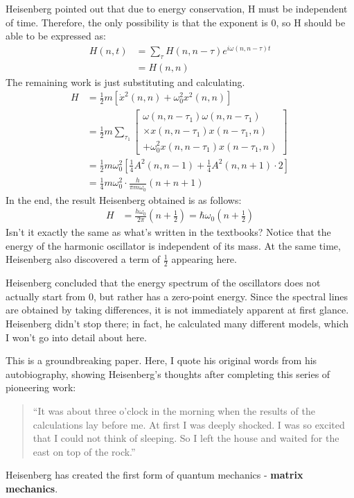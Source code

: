 \documentclass[a4paper, 12pt, oneside, onecolumn]{article}
\begin{document}
\begin{multicols}{2}
Heisenberg pointed out that due to energy conservation, H must be independent of time. Therefore, the only possibility is that the exponent is 0, so H should be able to be expressed as:
\begin{align}
	H \left( n, t \right)
	&= \sum_\tau H \left( n, n - \tau \right) e^{i \omega \left( n, n- \tau \right) t } \nonumber \\
	&= H \left( n, n \right)
\end{align}
The remaining work is just substituting and calculating.
\begin{align}
	H
	&= \frac{1}{2} m \left[ \dot x^2 \left( n, n \right) + \omega_0^2 x^2 \left( n, n \right) \right] \nonumber \\
	&= \frac{1}{2} m \sum_{\tau_1}
	\left[
	\begin{matrix}
	\omega \left( n, n - \tau_1 \right) \omega \left( n, n - \tau_1 \right) \\
	\times x \left( n, n - \tau_1 \right) x \left( n - \tau_1, n \right) \\
	+ \omega_0^2 x \left( n, n - \tau_1 \right) x \left( n - \tau_1, n \right)
	\end{matrix} 
	\right] \nonumber \\
	&= \frac{1}{2} m \omega_0^2\left[ \frac{1}{4} A^2 \left( n, n - 1 \right) + \frac{1}{4} A^2 \left(n, n + 1 \right) \cdot 2 \right] \nonumber \\
	&= \frac{1}{4} m \omega_0^2 \cdot \frac{h}{\pi m \omega_0} \left( n + n + 1 \right)
\end{align}
In the end, the result Heisenberg obtained is as follows:
\begin{align}
	H
	&= \frac{h \omega_0}{2 \pi} \left( n + \frac{1}{2} \right) = \hbar \omega_0 \left( n + \frac{1}{2} \right)
\end{align}
Isn't it exactly the same as what's written in the textbooks? Notice that the energy of the harmonic oscillator is independent of its mass. At the same time, Heisenberg also discovered a term of $\frac{1}{2}$ appearing here.

Heisenberg concluded that the energy spectrum of the oscillators does not actually start from $0$, but rather has a zero-point energy. Since the spectral lines are obtained by taking differences, it is not immediately apparent at first glance.
Heisenberg didn't stop there; in fact, he calculated many different models, which I won't go into detail about here.

This is a groundbreaking paper. Here, I quote his original words from his autobiography, showing Heisenberg's thoughts after completing this series of pioneering work:
\begin{quotation}
	``It was about three o'clock in the morning when the results of the calculations lay before me. At first I was deeply shocked. I was so excited that I could not think of sleeping. So I left the house and waited for the east on top of the rock.''\cite{heisenberg1971physics}
\end{quotation}
Heisenberg has created the first form of quantum mechanics - \textbf{matrix mechanics}.


\end{multicols}
\end{document}

